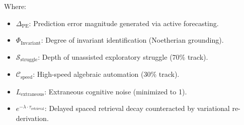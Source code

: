 \documentclass[11pt,a4paper]{article}
\begin{document}
Where:
\begin{itemize}
    \item $\Delta_{\text{PE}}$: Prediction error magnitude generated via active forecasting.
    \item $\Phi_{\text{Invariant}}$: Degree of invariant identification (Noetherian grounding).
    \item $\mathcal{S}_{\text{struggle}}$: Depth of unassisted exploratory struggle (70\% track).
    \item $\mathcal{C}_{\text{speed}}$: High-speed algebraic automation (30\% track).
    \item $L_{\text{extraneous}}$: Extraneous cognitive noise (minimized to 1).
    \item $e^{-\lambda \cdot \tau_{\text{retrieval}}}$: Delayed spaced retrieval decay counteracted by variational re-derivation.
\end{itemize}
\end{document}
